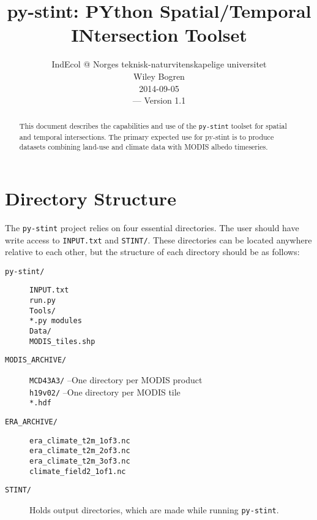 \documentclass[twoside,a4paper]{refart}
\title{py-stint: PYthon Spatial/Temporal INtersection Toolset}
\author{IndEcol @ Norges teknisk-naturvitenskapelige universitet \\
Wiley Bogren \\
2014-09-05   \\
--- Version 1.1}
\date{}
\begin{document}
\maketitle

\begin{abstract}
        This document describes the capabilities and use of the 
        \texttt{py-stint} toolset for spatial and temporal 
        intersections.  The primary expected use for py-stint is 
        to produce datasets combining land-use and climate data 
        with MODIS albedo timeseries.
\end{abstract}


\tableofcontents

\newpage




\section{Directory Structure}
\label{dirs}
The \texttt{py-stint} project relies on four essential directories.  
The user should have write access to \texttt{INPUT.txt} and \texttt{STINT/}. 
These directories can be located anywhere relative to each other, but the structure of each directory should be as follows:

\begin{description}
\item[\texttt{py-stint/}]
        \texttt{INPUT.txt}\\
        \texttt{run.py}\\
        \texttt{Tools/}\\
          \-\hspace{0.5cm} \texttt{*.py modules}\\
          \-\hspace{0.5cm} \texttt{Data/}\\
            \-\hspace{1.0cm} \texttt{MODIS\_tiles.shp}

\item[\texttt{MODIS\_ARCHIVE/}]
        \texttt{MCD43A3/}  --One directory per MODIS product\\
          \-\hspace{0.5cm} \texttt{h19v02/}  --One directory per MODIS tile\\
            \-\hspace{1.0cm} \texttt{*.hdf}

\item[\texttt{ERA\_ARCHIVE/}]
        \texttt{era\_climate\_t2m\_1of3.nc}\\
        \texttt{era\_climate\_t2m\_2of3.nc}\\
        \texttt{era\_climate\_t2m\_3of3.nc}\\
        \texttt{climate\_field2\_1of1.nc}
\item[\texttt{STINT/}]
        Holds output directories, which are made while running \texttt{py-stint}.
\end{description}
\end{document}
